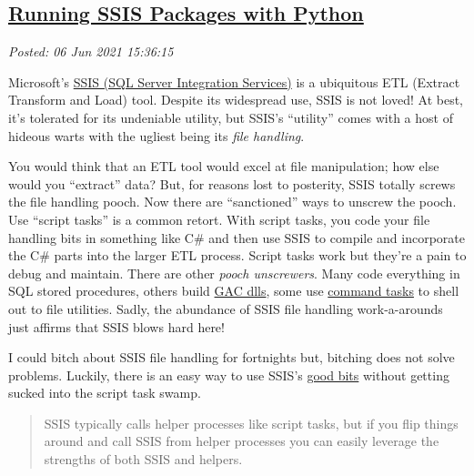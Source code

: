 %

\subsection*{\href{https://analyzethedatanotthedrivel.org/2021/06/05/running-ssis-packages-with-python/}{Running SSIS Packages with Python}}


\noindent\emph{Posted: 06 Jun 2021 15:36:15}
\vspace{6pt}


Microsoft's
\href{https://docs.microsoft.com/en-us/sql/integration-services/sql-server-integration-services?view=sql-server-ver15}{SSIS
(SQL Server Integration Services)} is a ubiquitous ETL (Extract
Transform and Load) tool. Despite its widespread use, SSIS is not loved!
At best, it's tolerated for its undeniable utility, but SSIS's
``utility'' comes with a host of hideous warts with the ugliest being
its \emph{file handling}.

You would think that an ETL tool would excel at file manipulation; how
else would you ``extract'' data? But, for reasons lost to posterity,
SSIS totally screws the file handling pooch. Now there are
``sanctioned'' ways to unscrew the pooch. Use ``script tasks'' is a
common retort. With script tasks, you code your file handling bits in
something like C\# and then use SSIS to compile and incorporate the C\#
parts into the larger ETL process. Script tasks work but they're a pain
to debug and maintain. There are other \emph{pooch unscrewers}. Many
code everything in SQL stored procedures, others build
\href{https://stackoverflow.com/questions/1268342/what-is-the-gac-in-net}{GAC
dlls}, some use
\href{https://docs.microsoft.com/en-us/sql/integration-services/control-flow/execute-process-task?view=sql-server-ver15}{command
tasks} to shell out to file utilities. Sadly, the abundance of SSIS file
handling work-a-arounds just affirms that SSIS blows hard here!

I could bitch about SSIS file handling for fortnights but, bitching does
not solve problems. Luckily, there is an easy way to use SSIS's
\href{https://www.youtube.com/watch?v=wPiHQ37gXnE}{good bits} without
getting sucked into the script task swamp.

\begin{quote}
SSIS typically calls helper processes like script tasks, but if you flip
things around and call SSIS from helper processes you can easily
leverage the strengths of both SSIS and helpers.
\end{quote}

